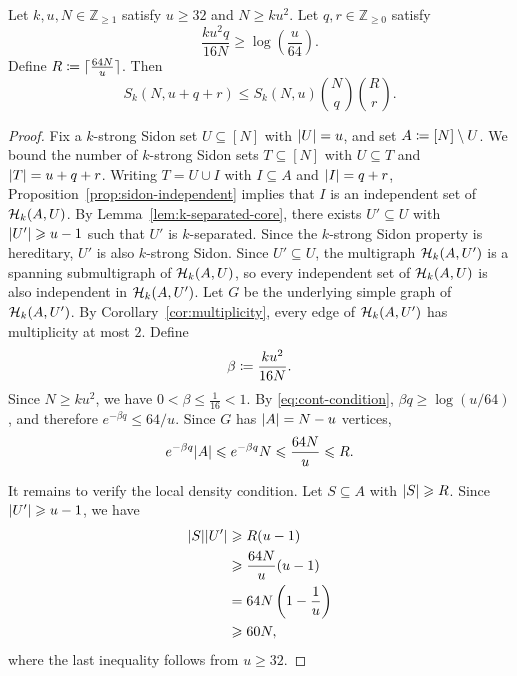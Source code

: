 \documentclass[reqno,a4paper,12pt]{amsart}
\begin{document}
\begin{proposition}
    \label{prop:containers-sidon}
    Let \(k,u,N\in\mathbb Z_{\geq1}\) satisfy \(u\geq32\) and \(N\geq ku^2\).
    Let \(q,r\in\mathbb Z_{\geq0}\) satisfy
    \begin{equation}
        \label{eq:cont-condition}
        \frac{ku^2q}{16N}
        \geq
        \log\left(\frac{u}{64}\right).
    \end{equation}
    Define \(R\mathrel{\coloneqq}\lceil\frac{64N}{u}\rceil\).
    Then
    \[
        S_k(N,u+q+r)
        \leq
        S_k(N,u)
        \binom Nq
        \binom Rr.
    \]
\end{proposition}

\begin{proof}
    Fix a \(k\)-strong Sidon set \(U\subseteq[N]\) with \(\lvert U\rvert=u\),
    and set \(A\mathrel{\coloneqq}[N]\setminus U\). We bound the number of \(k\)-strong Sidon sets \(T\subseteq[N]\)
    with \(U\subseteq T\) and \(\lvert T\rvert=u+q+r\).
    Writing \(T=U\cup I\) with \(I\subseteq A\) and \(\lvert I\rvert=q+r\),
    Proposition~\ref{prop:sidon-independent} implies that \(I\) is
    an independent set of \(\mathcal{H}_k(A,U)\). By Lemma~\ref{lem:k-separated-core}, there exists \(U'\subseteq U\)
    with \(\lvert U'\rvert\geqslant u-1\) such that \(U'\) is \(k\)-separated.
    Since the \(k\)-strong Sidon property is hereditary, \(U'\) is
    also \(k\)-strong Sidon. Since \(U'\subseteq U\), the multigraph \(\mathcal{H}_k(A,U')\)
    is a spanning submultigraph of \(\mathcal{H}_k(A,U)\), so every
    independent set of \(\mathcal{H}_k(A,U)\) is also independent in
    \(\mathcal{H}_k(A,U')\). Let \(G\) be the underlying simple graph of
    \(\mathcal{H}_k(A,U')\). By Corollary~\ref{cor:multiplicity}, every edge
    of \(\mathcal{H}_k(A,U')\) has multiplicity at most \(2\).
    Define
    \[
        \beta\mathrel{\coloneqq}\frac{ku^2}{16N}.
    \]
    Since \(N\geq ku^2\), we have \(0<\beta\leq\frac1{16}<1\).
    By \eqref{eq:cont-condition}, \(\beta q\geq\log(u/64)\),
    and therefore \(e^{-\beta q}\leq 64/u\).
    Since \(G\) has \(\lvert A\rvert=N-u\) vertices,
    \[
        e^{-\beta q}\lvert A\rvert
        \leqslant
        e^{-\beta q}N
        \leqslant
        \frac{64N}{u}
        \leqslant
        R.
    \]

    It remains to verify the local density condition.
    Let \(S\subseteq A\) with \(\lvert S\rvert\geqslant R\).
    Since \(\lvert U'\rvert\geqslant u-1\),
    we have
    \begin{align*}
        \lvert S\rvert\lvert U'\rvert
         & \geqslant
        R(u-1)                    \\
         & \geqslant
        \frac{64N}{u}(u-1)        \\
         & =
        64N\left(1-\frac1u\right) \\
         & \geqslant
        60N,
    \end{align*}
    where the last inequality follows from \(u\geq32\).


\end{proof}
\end{document}
